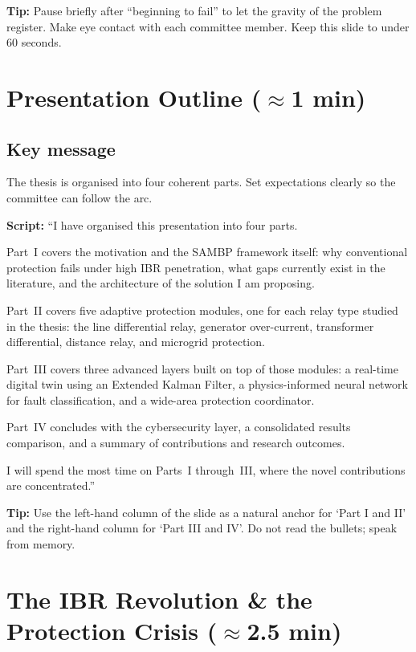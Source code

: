 \documentclass[11pt,a4paper]{article}
\newcommand{\script}[1]{\begin{scriptbox}\textbf{Script:} #1\end{scriptbox}}
\newcommand{\tip}[1]{\begin{tipbox}\textbf{Tip:} #1\end{tipbox}}
\begin{document}
\tip{Pause briefly after ``beginning to fail'' to let the gravity of the problem register.
Make eye contact with each committee member. Keep this slide to under 60 seconds.}

\section{Presentation Outline \hfill\normalfont\small($\approx$1 min)}
\label{slide:outline}

\subsection*{Key message}
The thesis is organised into four coherent parts. Set expectations clearly
so the committee can follow the arc.

\script{%
``I have organised this presentation into four parts.

Part~I covers the motivation and the SAMBP framework itself: why conventional protection
fails under high IBR penetration, what gaps currently exist in the literature, and the
architecture of the solution I am proposing.

Part~II covers five adaptive protection modules, one for each relay type studied in the
thesis: the line differential relay, generator over-current, transformer differential,
distance relay, and microgrid protection.

Part~III covers three advanced layers built on top of those modules: a real-time digital
twin using an Extended Kalman Filter, a physics-informed neural network for fault
classification, and a wide-area protection coordinator.

Part~IV concludes with the cybersecurity layer, a consolidated results comparison, and a
summary of contributions and research outcomes.

I will spend the most time on Parts~I through~III, where the novel contributions are
concentrated.''%
}

\tip{Use the left-hand column of the slide as a natural anchor for `Part I and II' and
the right-hand column for `Part III and IV'. Do not read the bullets; speak from memory.}

\section{The IBR Revolution \& the Protection Crisis \hfill\normalfont\small($\approx$2.5 min)}
\label{slide:motivation}
\end{document}
